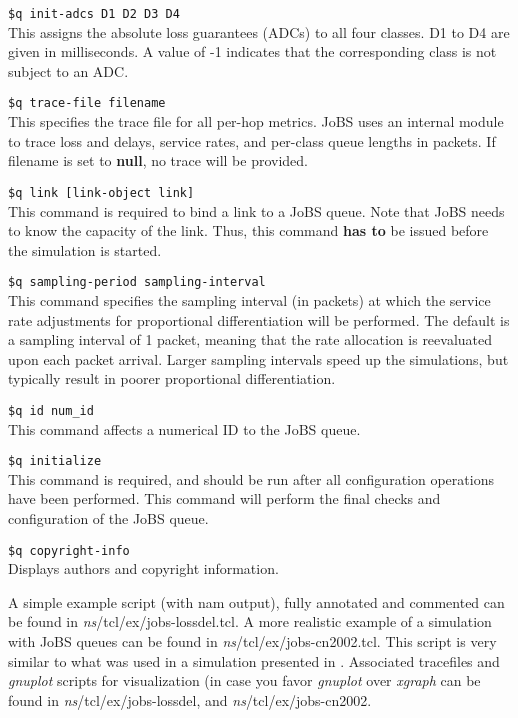 \begin{flushleft}
{\tt \$q init-adcs \<D1\> \<D2\> \<D3\> \<D4\>}\\
This assigns the absolute loss guarantees (ADCs) to all four classes. D1 to D4 
are given in milliseconds. A value of -1 indicates that 
the corresponding class is not subject to an ADC.

{\tt \$q trace-file \<filename\>}\\
This specifies the trace file for all per-hop metrics. JoBS uses an internal 
module to trace
loss and delays, service rates, and per-class queue lengths in packets. 
If filename is set to {\bf null}, no trace will be provided.

{\tt \$q link [\<link-object\> link]}\\
This command is required to bind a link to a JoBS queue. Note that JoBS needs
to know the capacity of the link. Thus, 
this command {\bf has to} be issued before 
the simulation is started.

{\tt \$q sampling-period \<sampling-interval\>}\\
This command specifies the sampling interval (in packets) at which the service 
rate adjustments for proportional differentiation will be performed. The 
default is a sampling interval of 1 packet, meaning that the rate allocation 
is reevaluated upon each packet arrival. Larger sampling intervals speed up 
the simulations, but typically result in poorer proportional differentiation.

{\tt \$q id \<num\_id\>}\\
This command affects a numerical ID to the JoBS queue. 

{\tt \$q initialize}\\
This command is required, and should be run after all configuration operations 
have been performed. 
This command will perform the final checks and configuration of the JoBS queue.

{\tt \$q copyright-info}\\ 
Displays authors and copyright information.

A simple example script (with nam output), fully annotated and commented 
can be found in \emph{ns}/tcl/ex/jobs-lossdel.tcl. 
A more realistic example of a simulation with JoBS queues can be found in 
\emph{ns}/tcl/ex/jobs-cn2002.tcl. This script is very similar to what was used in 
a simulation presented in \cite{LiCh02}. 
Associated tracefiles and {\em gnuplot} scripts for visualization (in case you 
favor {\em gnuplot} over {\em xgraph}
can be found in \emph{ns}/tcl/ex/jobs-lossdel, and \emph{ns}/tcl/ex/jobs-cn2002.


\end{flushleft}

